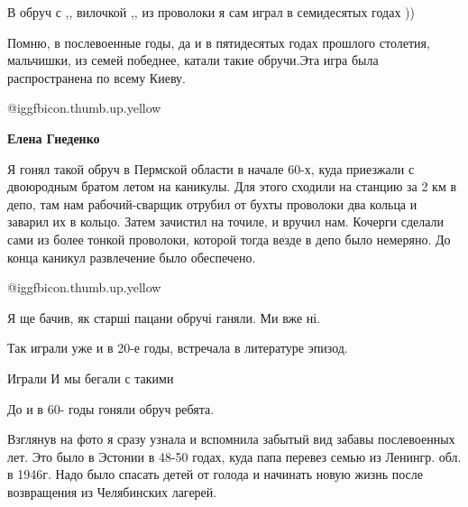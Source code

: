  
 
 
 
 
\zzSecCmt

\begin{itemize} %
В обруч с ,, вилочкой ,, из проволоки я сам играл в семидесятых годах ))


Помню, в послевоенные годы, да и в пятидесятых годах прошлого столетия,
мальчишки, из семей победнее, катали такие обручи.Эта игра была распространена
по всему Киеву.

\begin{itemize} %
 @igg{fbicon.thumb.up.yellow} 

\textbf{Елена Гнеденко} 

Я гонял такой обруч в Пермской области в начале 60-х, куда приезжали с
двоюродным братом летом на каникулы. Для этого сходили на станцию за 2 км в
депо, там нам рабочий-сварщик отрубил от бухты проволоки два кольца и заварил
их в кольцо. Затем зачистил на точиле, и вручил нам. Кочерги сделали сами из
более тонкой проволоки, которой тогда везде в депо было немеряно. До конца
каникул развлечение было обеспечено.

 @igg{fbicon.thumb.up.yellow} 
\end{itemize} %

Я ще бачив, як старші пацани обручі ганяли. Ми вже ні.

Так играли уже и в 20-е годы, встречала в литературе эпизод.

Играли
И мы бегали с такими

До и в 60- годы гоняли обруч ребята.


Взглянув на фото я сразу узнала и вспомнила забытый вид забавы послевоенных
лет. Это было в Эстонии в 48-50 годах, куда папа перевез семью из Ленингр. обл. в
1946г. Надо было спасать детей от голода и начинать новую жизнь после
возвращения из Челябинских лагерей.



\end{itemize}
